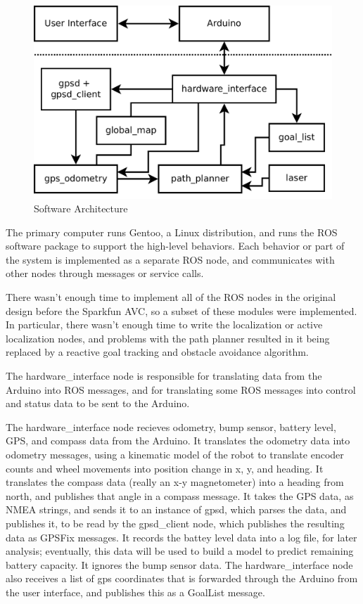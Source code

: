 
\begin{figure}
\includegraphics[width=1\textwidth]{software_flow}
\caption{Software Architecture}
\end{figure}

The primary computer runs Gentoo, a Linux distribution, and runs the ROS software package to support the high-level behaviors. Each behavior or part of the system is implemented as a separate ROS node, and communicates with other nodes through messages or service calls.

There wasn't enough time to implement all of the ROS nodes in the original design before the Sparkfun AVC, so a subset of these modules were implemented. In particular, there wasn't enough time to write the localization or active localization nodes, and problems with the path planner resulted in it being replaced by a reactive goal tracking and obstacle avoidance algorithm.

The hardware\_interface node is responsible for translating data from the Arduino into ROS messages, and for translating some ROS messages into control and status data to be sent to the Arduino. 

The hardware\_interface node recieves odometry, bump sensor, battery level, GPS, and compass data from the Arduino. It translates the odometry data into odometry messages, using a kinematic model of the robot to translate encoder counts and wheel movements into position change in x, y, and heading. It translates the compass data (really an x-y magnetometer) into a heading from north, and publishes that angle in a compass message. It takes the GPS data, as NMEA strings, and sends it to an instance of gpsd\cite{gpsd}, which parses the data, and publishes it, to be read by the gpsd\_client node, which publishes the resulting data as GPSFix messages. It records the battey level data into a log file, for later analysis; eventually, this data will be used to build a model to predict remaining battery capacity. It ignores the bump sensor data. The hardware\_interface node also receives a list of gps coordinates that is forwarded through the Arduino from the user interface, and publishes this as a GoalList message.

